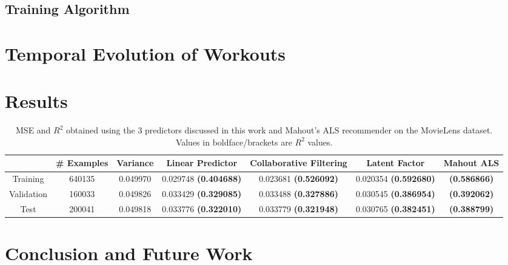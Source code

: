 \documentclass{acm_proc_article-sp}
\begin{document}
\subsection{Training Algorithm}


\section{Temporal Evolution of Workouts}
\label{secTemporalModelWorkouts}

\section{Results}

\begin{table*}
\centering
\begin{tabular}{|c|c|c|c|c|c|c|} \hline
& \# Examples & Variance & Linear Predictor & Collaborative Filtering & Latent Factor & Mahout ALS \\ \hline
Training & 640135 & 0.049970 & 0.029748 {\bf(0.404688)} & 0.023681 {\bf(0.526092)} & 0.020354 {\bf(0.592680)} & {\bf(0.586866)} \\ \hline
Validation & 160033 & 0.049826 & 0.033429 {\bf(0.329085)}  & 0.033488 {\bf(0.327886)} & 0.030545 {\bf(0.386954)} & {\bf(0.392062)} \\ \hline
Test & 200041 & 0.049818 & 0.033776 {\bf(0.322010)} & 0.033779 {\bf(0.321948)} & 0.030765 {\bf(0.382451)} & {\bf(0.388799)}\\ \hline
\end{tabular}
\caption{MSE and $R^2$ obtained using the 3 predictors discussed in this work and Mahout's ALS recommender on the MovieLens dataset. Values in boldface/brackets are $R^2$ values.}
\label{tableResults}
\end{table*}

\section{Conclusion and Future Work}



\end{document}
